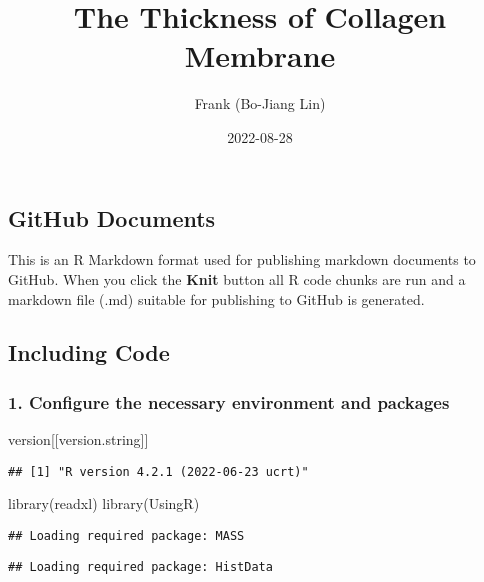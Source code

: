 \documentclass[
]{article}
\title{The Thickness of Collagen Membrane}
\author{Frank (Bo-Jiang Lin)}
\date{2022-08-28}
\newenvironment{Shaded}{\begin{snugshade}}{\end{snugshade}}
\newcommand{\FunctionTok}[1]{\textcolor[rgb]{0.00,0.00,0.00}{#1}}
\newcommand{\NormalTok}[1]{#1}
\newcommand{\StringTok}[1]{\textcolor[rgb]{0.31,0.60,0.02}{#1}}
\begin{document}
\maketitle

\hypertarget{github-documents}{%
\subsection{GitHub Documents}\label{github-documents}}

This is an R Markdown format used for publishing markdown documents to
GitHub. When you click the \textbf{Knit} button all R code chunks are
run and a markdown file (.md) suitable for publishing to GitHub is
generated.

\hypertarget{including-code}{%
\subsection{Including Code}\label{including-code}}

\hypertarget{configure-the-necessary-environment-and-packages}{%
\subsubsection{1. Configure the necessary environment and
packages}\label{configure-the-necessary-environment-and-packages}}

\begin{Shaded}
\begin{Highlighting}[]
\NormalTok{version[[}\StringTok{\textquotesingle{}version.string\textquotesingle{}}\NormalTok{]]}
\end{Highlighting}
\end{Shaded}

\begin{verbatim}
## [1] "R version 4.2.1 (2022-06-23 ucrt)"
\end{verbatim}

\begin{Shaded}
\begin{Highlighting}[]
\FunctionTok{library}\NormalTok{(readxl)}
\FunctionTok{library}\NormalTok{(UsingR)}
\end{Highlighting}
\end{Shaded}

\begin{verbatim}
## Loading required package: MASS
\end{verbatim}

\begin{verbatim}
## Loading required package: HistData
\end{verbatim}
\end{document}
